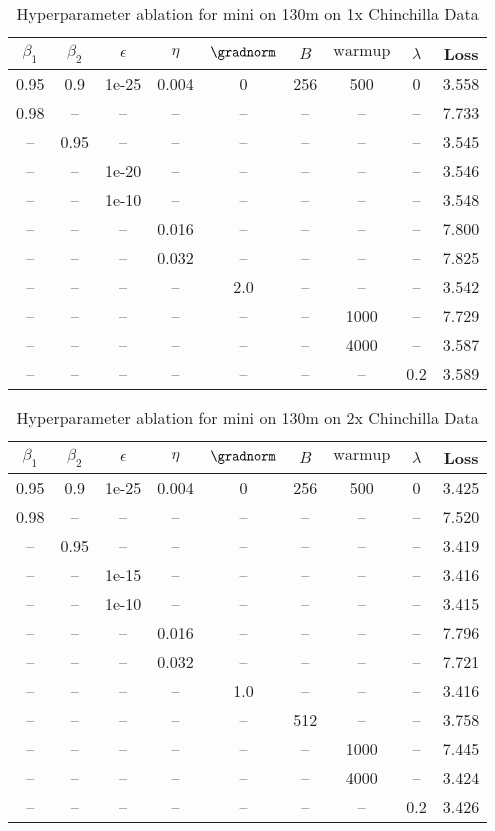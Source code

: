 \begin{table}[h!]
\centering
\caption{Hyperparameter ablation for mini on 130m on 1x Chinchilla Data}
\label{tab:ablation_mini_130m_on_1x_chinchilla_data}
\begin{tabular}{ccccccccc}
\toprule
$\beta_1$ & $\beta_2$ & $\epsilon$ & $\eta$ & $\gradnorm$ & $B$ & $\mathrm{warmup}$ & $\lambda$ & Loss \\
\midrule
0.95 & 0.9 & 1e-25 & 0.004 & 0 & 256 & 500 & 0 & 3.558 \\
\midrule
0.98 & -- & -- & -- & -- & -- & -- & -- & 7.733 \\
-- & 0.95 & -- & -- & -- & -- & -- & -- & 3.545 \\
-- & -- & 1e-20 & -- & -- & -- & -- & -- & 3.546 \\
-- & -- & 1e-10 & -- & -- & -- & -- & -- & 3.548 \\
-- & -- & -- & 0.016 & -- & -- & -- & -- & 7.800 \\
-- & -- & -- & 0.032 & -- & -- & -- & -- & 7.825 \\
-- & -- & -- & -- & 2.0 & -- & -- & -- & 3.542 \\
-- & -- & -- & -- & -- & -- & 1000 & -- & 7.729 \\
-- & -- & -- & -- & -- & -- & 4000 & -- & 3.587 \\
-- & -- & -- & -- & -- & -- & -- & 0.2 & 3.589 \\
\bottomrule
\end{tabular}
\end{table}

\begin{table}[h!]
\centering
\caption{Hyperparameter ablation for mini on 130m on 2x Chinchilla Data}
\label{tab:ablation_mini_130m_on_2x_chinchilla_data}
\begin{tabular}{ccccccccc}
\toprule
$\beta_1$ & $\beta_2$ & $\epsilon$ & $\eta$ & $\gradnorm$ & $B$ & $\mathrm{warmup}$ & $\lambda$ & Loss \\
\midrule
0.95 & 0.9 & 1e-25 & 0.004 & 0 & 256 & 500 & 0 & 3.425 \\
\midrule
0.98 & -- & -- & -- & -- & -- & -- & -- & 7.520 \\
-- & 0.95 & -- & -- & -- & -- & -- & -- & 3.419 \\
-- & -- & 1e-15 & -- & -- & -- & -- & -- & 3.416 \\
-- & -- & 1e-10 & -- & -- & -- & -- & -- & 3.415 \\
-- & -- & -- & 0.016 & -- & -- & -- & -- & 7.796 \\
-- & -- & -- & 0.032 & -- & -- & -- & -- & 7.721 \\
-- & -- & -- & -- & 1.0 & -- & -- & -- & 3.416 \\
-- & -- & -- & -- & -- & 512 & -- & -- & 3.758 \\
-- & -- & -- & -- & -- & -- & 1000 & -- & 7.445 \\
-- & -- & -- & -- & -- & -- & 4000 & -- & 3.424 \\
-- & -- & -- & -- & -- & -- & -- & 0.2 & 3.426 \\
\bottomrule
\end{tabular}
\end{table}

